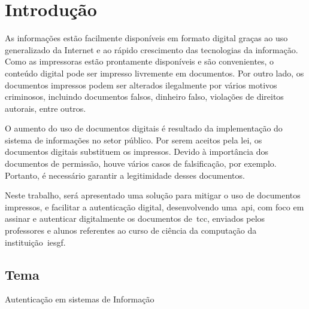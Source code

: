\chapter{Introdução}\label{ch:introducao}

As informações estão facilmente disponíveis em formato digital graças ao uso
generalizado da Internet e ao rápido crescimento das tecnologias da informação.
Como as impressoras estão prontamente disponíveis e são convenientes, o conteúdo
digital pode ser impresso livremente em documentos.
Por outro lado, os documentos impressos podem ser alterados ilegalmente por
vários motivos criminosos, incluindo documentos falsos, dinheiro falso,
violações de direitos autorais, entre outros\cite{tsai2019}.

O aumento do uso de documentos digitais é resultado da implementação do
sistema de informações no setor público.
Por serem aceitos pela lei, os documentos digitais substituem os impressos.
Devido à importância dos documentos de permissão, houve vários casos de
falsificação, por exemplo.
Portanto, é necessário garantir a legitimidade desses documentos\cite{rrief2019}.

Neste trabalho, será apresentado uma solução para mitigar o uso de documentos
impressos, e facilitar a autenticação digital, desenvolvendo uma~\acrfull{api},
com foco em assinar e autenticar digitalmente os documentos de~\acrfull{tcc},
enviados pelos professores e alunos referentes ao curso de ciência da computação
da instituição~\acrlong{iesgf}.
\section{Tema}\label{sec:tema}
Autenticação em sistemas de Informação




